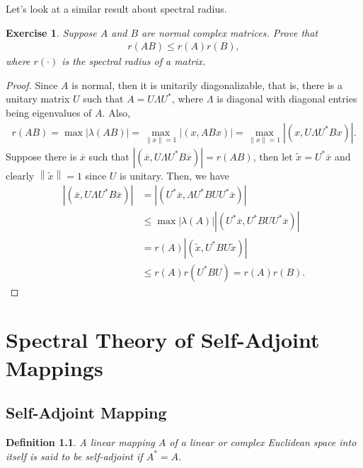 \documentclass[11pt]{book}
\newtheorem{definition}{Definition}[chapter]
\newtheorem{exercise}{Exercise}[section]
\theoremstyle{definition}
\numberwithin{equation}{chapter}
\begin{document}
Let's look at a similar result about spectral radius.

\medskip

\begin{exercise}
Suppose $A$ and $B$ are normal complex matrices. Prove that 
\begin{align*}
    r(AB) \leq r(A)r(B),
\end{align*}
where $r(\cdot)$ is the spectral radius of a matrix.
\end{exercise}
\begin{proof}
Since $A$ is normal, then it is unitarily diagonalizable, that is, there is a unitary matrix $U$ such that $A = U \Lambda U^*$, where $\Lambda$ is diagonal with diagonal entries being eigenvalues of $A$. Also,
\begin{align*}
    r(AB) = \max \left|\lambda(AB)\right| = \max_{\left\|x\right\|=1} \left|(x, ABx)\right| = \max_{\left\|x\right\|=1} \left|(x, U \Lambda U^*Bx)\right|.
\end{align*}
Suppose there is $\overline{x}$ such that $\left|(\overline{x}, U \Lambda U^*B\overline{x})\right| = r(AB)$, then let $\widetilde{x} = U^*\overline{x}$ and clearly $\left\|\widetilde{x}\right\| = 1$ since $U$ is unitary. Then, we have
\begin{align*}
    \left|(\overline{x}, U \Lambda U^*B\overline{x})\right| & = \left|(U^*\overline{x}, \Lambda U^*BU U^*\overline{x})\right| \\
    & \leq \max \left|\lambda(A)\right| \left|(U^*\overline{x}, U^*BU U^*\overline{x})\right| \\
    & = r(A) \left|(\widetilde{x}, U^*BU \widetilde{x})\right| \\
    & \leq r(A) r(U^*BU) = r(A) r(B).
\end{align*}
\end{proof}




\chapter{Spectral Theory of Self-Adjoint Mappings}
\section{Self-Adjoint Mapping}
\begin{definition}
A linear mapping $A$ of a linear or complex Euclidean space into itself is said to be self-adjoint if $A^* = A$.
\end{definition}
\end{document}
